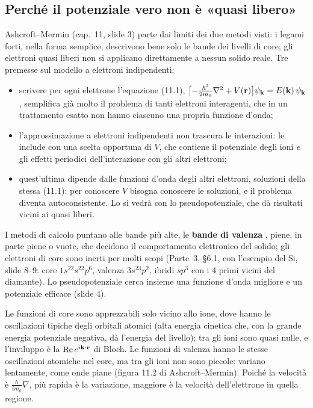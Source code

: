 \documentclass[11pt,a4paper]{article}
\begin{document}
\subsection{Perché il potenziale vero non è «quasi libero»}\label{sec:pseudomotivi}
Ashcroft--Mermin (cap.~11, slide 3) parte dai limiti dei due metodi visti: i legami forti, nella forma semplice, descrivono bene solo le bande dei
livelli di core; gli elettroni quasi liberi non si applicano direttamente a nessun solido reale. Tre premesse sul modello a elettroni indipendenti:
\begin{itemize}[leftmargin=*]
\item[\#1] scrivere per ogni elettrone l'equazione (11.1), $\bigl[-\frac{\hbar^2}{2m_0}\nabla^2+V(\mathbf r)\bigr]\psi_{\mathbf k}=E(\mathbf k)\,\psi_{\mathbf k}$, semplifica
già molto il problema di tanti elettroni interagenti, che in un trattamento esatto non hanno ciascuno una propria funzione d'onda;
\item[\#2] l'approssimazione a elettroni indipendenti non trascura le interazioni: le include con una scelta opportuna di $V$, che contiene il potenziale
degli ioni \emph{e} gli effetti periodici dell'interazione con gli altri elettroni;
\item[\#3] quest'ultima dipende dalle funzioni d'onda degli altri elettroni, soluzioni della stessa (11.1): per conoscere $V$ bisogna conoscere le
soluzioni, e il problema diventa autoconsistente. Lo si vedrà con lo pseudopotenziale, che dà risultati vicini ai quasi liberi.
\end{itemize}
I metodi di calcolo puntano alle bande più alte, le \textbf{bande di valenza} , piene, in parte piene o vuote, che decidono il
comportamento elettronico del solido; gli elettroni di core sono inerti per molti scopi (Parte~3, §6.1, con l'esempio del Si, slide 8--9:
core $1s^22s^22p^6$, valenza $3s^23p^2$, ibridi $sp^3$ con i 4 primi vicini del diamante). Lo pseudopotenziale cerca insieme una funzione d'onda migliore
e un potenziale efficace (slide 4).

Le funzioni di core sono apprezzabili solo vicino allo ione, dove hanno le oscillazioni tipiche degli orbitali atomici (alta energia cinetica che, con
la grande energia potenziale negativa, dà l'energia del livello); tra gli ioni sono quasi nulle, e l'inviluppo è la $\mathrm{Re}\,e^{i\mathbf k\cdot\mathbf r}$ di
Bloch. Le funzioni di valenza hanno le stesse oscillazioni atomiche nel core, ma tra gli ioni non sono piccole: variano lentamente, come onde piane
(figura 11.2 di Ashcroft--Mermin). Poiché la velocità è $\frac\hbar{im_0}\nabla$, più rapida è la variazione, maggiore è la velocità dell'elettrone in
quella regione.
\end{document}
